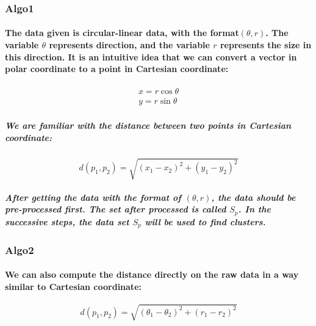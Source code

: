 \documentclass{article}
\begin{document}
\subsubsection{Algo1}
\paragraph{
The data given is circular-linear data, with the format$(\theta, r)$. The variable $\theta$ represents direction, and the variable $r$ represents the size in this direction. It is an intuitive idea that we can convert a vector in polar coordinate to a point in Cartesian coordinate:
}

\begin{equation}
\begin{aligned}
x = r \cos{\theta} \\
y = r \sin {\theta}
\end{aligned}
\end{equation}

\subparagraph{
We are familiar with the distance between two points in Cartesian coordinate:
}

\begin{equation}
d(p_{1}, p_{2}) = \sqrt{(x_{1} - x_{2})^2 + ({y_1 - y_2})^2}
\end{equation}

\subparagraph{
After getting the data with the format of $(\theta,r)$, the data should be pre-processed first. The set after processed is called $S_p$. In the successive steps, the data set $S_p$ will be used to find clusters.
}

\subsubsection{Algo2}
\paragraph{
We can also compute the distance directly on the raw data in a way similar to Cartesian coordinate:
}

\begin{equation}
d(p_1, p_2) = \sqrt{({\theta_1 - \theta_2})^2 + ({r_1 - r_2})^2}
\end{equation}
\end{document}
